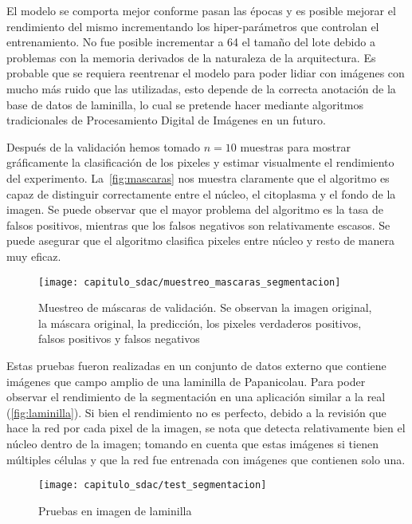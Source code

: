 El modelo se comporta mejor conforme pasan las épocas y es posible mejorar el
rendimiento del mismo incrementando los hiper-parámetros que controlan el
entrenamiento. No fue posible incrementar a 64 el tamaño del lote debido a
problemas con la memoria derivados de la naturaleza de la arquitectura. Es
probable que se requiera reentrenar el modelo para poder lidiar con imágenes con
mucho más ruido que las utilizadas, esto depende de la correcta anotación de la
base de datos de laminilla, lo cual se pretende hacer mediante algoritmos
tradicionales de Procesamiento Digital de Imágenes en un futuro.

Después de la validación hemos tomado \(n = 10\) muestras para mostrar
gráficamente la clasificación de los pixeles y estimar visualmente el
rendimiento del experimento. La~\autoref{fig:mascaras} nos muestra claramente
que el algoritmo es capaz de distinguir correctamente entre el núcleo, el
citoplasma y el fondo de la imagen. Se puede observar que el mayor problema del
algoritmo es la tasa de falsos positivos, mientras que los falsos negativos son
relativamente escasos. Se puede asegurar que el algoritmo clasifica pixeles
entre núcleo y resto de manera muy eficaz.

\begin{figure}[H]
    \centering
    \texttt{[image: capitulo\_sdac/muestreo\_mascaras\_segmentacion]}
    \caption{Muestreo de máscaras de validación. Se observan la imagen original, la máscara original,
    la predicción, los pixeles verdaderos positivos, falsos positivos y falsos negativos}\label{fig:mascaras}
\end{figure}

Estas pruebas fueron realizadas en un conjunto de datos externo que contiene
imágenes que campo amplio de una laminilla de Papanicolau. Para poder observar
el rendimiento de la segmentación en una aplicación similar a la real
(\autoref{fig:laminilla}). Si bien el rendimiento no es perfecto, debido a la
revisión que hace la red por cada pixel de la imagen, se nota que detecta
relativamente bien el núcleo dentro de la imagen; tomando en cuenta que estas
imágenes si tienen múltiples células y que la red fue entrenada con imágenes que
contienen solo una.

\begin{figure}[H]
    \centering
    \texttt{[image: capitulo\_sdac/test\_segmentacion]}
    \caption{Pruebas en imagen de laminilla}\label{fig:laminilla}
\end{figure}

